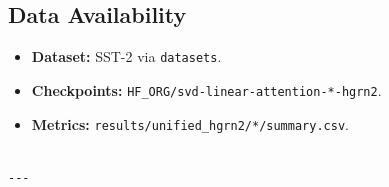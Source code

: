 \subsection{Data Availability}

\begin{itemize}
\item \textbf{Dataset:} SST-2 via \texttt{datasets}.
\item \textbf{Checkpoints:} \texttt{{{HF\_ORG}}/svd-linear-attention-*-hgrn2}.
\item \textbf{Metrics:} \texttt{results/unified\_hgrn2/*/summary.csv}.
\end{itemize}
\begin{lstlisting}

---
\end{lstlisting}